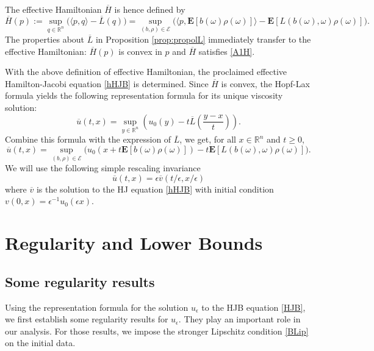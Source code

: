 \documentclass[11pt,reqno]{amsart}
\theoremstyle{definition}
\theoremstyle{remark}
\numberwithin{equation}{section}
\newcommand{\eps}{\epsilon}
\newcommand{\R}{{\mathbb{R}}}
\begin{document}
The effective Hamiltonian $\overline{H}$ is hence defined by
\begin{equation}\label{EffH}
    \overline{H}(p):= \sup_{q\in\mathbb{R}^n}\Big( \langle p, q \rangle - \overline{L}(q) \Big) = \sup_{(b,\rho)\in \mathscr{E}}\Big( \langle p, \mathbf{E}[b(\omega)\rho(\omega)] \rangle - \mathbf{E}[L(b(\omega),\omega)\rho(\omega)]\Big).
\end{equation}
The properties about $\overline{L}$ in Proposition \ref{prop:propolL} immediately transfer to the effective Hamiltonian: $\overline{H}(p)$ is convex in $p$ and $\overline{H}$ satisfies \eqref{A1H}. 

With the above definition of effective Hamiltonian, the proclaimed effective Hamilton-Jacobi equation \eqref{hHJB} is determined. Since $\overline{H}$ is convex, the Hopf-Lax formula yields the following representation formula for its unique viscosity solution:
\begin{equation}
\label{eq:HopfLax}
    \overline{u}(t,x) = \sup_{y\in\mathbb{R}^n}\left(u_{0}(y)- t \overline{L}(\frac{y-x}{t})\right).
\end{equation}
Combine this formula with the expression of $\overline{L}$, we get, for all $x\in \R^n$ and $t\ge 0$,
\begin{equation}
    \label{eq:ubarformula}
\overline{u}(t,x) = \sup_{(b,\rho) \in \mathscr{E}} \Big( u_0(x+t\mathbf{E}[b(\omega)\rho(\omega)]) - t\mathbf{E}[L(b(\omega),\omega)\rho(\omega)]\Big).
\end{equation}
We will use the following simple rescaling invariance
\begin{equation*}
    \overline{u}(t,x) = \eps \overline{v}(t/\eps,x/\eps)%
\end{equation*}
where $\overline{v}$ is the solution to the HJ equation \eqref{hHJB} with initial condition $v(0,x) = \eps^{-1}u_0(\eps x)$.

\section{Regularity and Lower Bounds}
\label{sec:lowerbdd}

\subsection{Some regularity results} Using the representation formula for the solution $u_\eps$ to the HJB equation \eqref{HJB}, we first establish some regularity results for $u_\eps$. They play an important role in our analysis. 
For those results, we impose the stronger Lipschitz condition \eqref{BLip} on the initial data.
\end{document}
